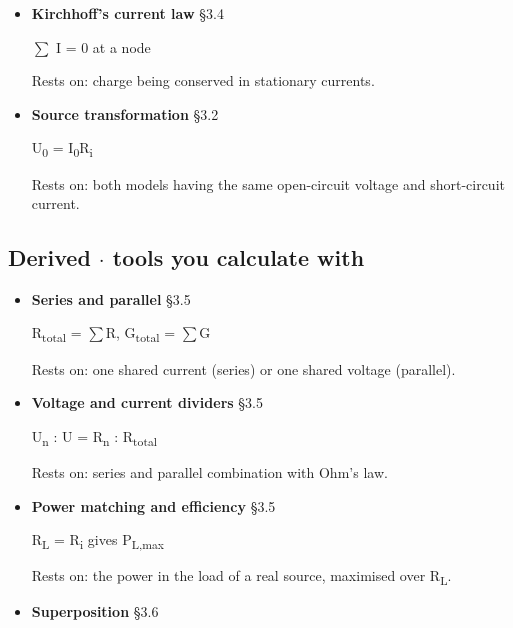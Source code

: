 \documentclass[11pt]{article}
\begin{document}
\begin{keepsection}
\begin{itemize}
\ensuremath{\textstyle\sum} U = 0 round a mesh

Rests on: the closed line integral of the static field being zero.
\item {}
\textbf{Kirchhoff’s current law} \hfill{\small\color{FAUblue}§3.4}

\ensuremath{\textstyle\sum} I = 0 at a node

Rests on: charge being conserved in stationary currents.
\item {}
\textbf{Source transformation} \hfill{\small\color{FAUblue}§3.2}

U\textsubscript{0} = I\textsubscript{0}R\textsubscript{i}

Rests on: both models having the same open-circuit voltage and short-circuit current.
\end{itemize}

\subsection{Derived \ensuremath{\cdot} tools you calculate with}

\begin{itemize}
\item {}
\textbf{Series and parallel} \hfill{\small\color{FAUblue}§3.5}

R\textsubscript{total} = \ensuremath{\textstyle\sum}R, G\textsubscript{total} = \ensuremath{\textstyle\sum}G

Rests on: one shared current (series) or one shared voltage (parallel).
\item {}
\textbf{Voltage and current dividers} \hfill{\small\color{FAUblue}§3.5}

U\textsubscript{n} : U = R\textsubscript{n} : R\textsubscript{total}

Rests on: series and parallel combination with Ohm’s law.
\item {}
\textbf{Power matching and efficiency} \hfill{\small\color{FAUblue}§3.5}

R\textsubscript{L} = R\textsubscript{i} gives P\textsubscript{L,max}

Rests on: the power in the load of a real source, maximised over R\textsubscript{L}.
\item {}
\textbf{Superposition} \hfill{\small\color{FAUblue}§3.6}


\end{itemize}
\end{keepsection}
\end{document}
